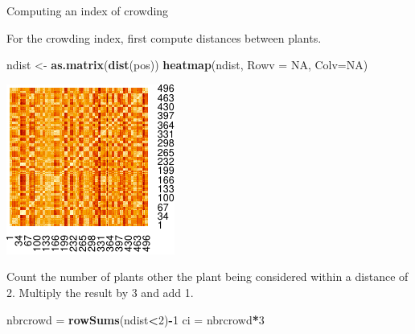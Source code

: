 \documentclass[
  ignorenonframetext,
]{beamer}
\newenvironment{Shaded}{\begin{snugshade}}{\end{snugshade}}
\newcommand{\DataTypeTok}[1]{\textcolor[rgb]{0.13,0.29,0.53}{#1}}
\newcommand{\DecValTok}[1]{\textcolor[rgb]{0.00,0.00,0.81}{#1}}
\newcommand{\KeywordTok}[1]{\textcolor[rgb]{0.13,0.29,0.53}{\textbf{#1}}}
\newcommand{\NormalTok}[1]{#1}
\newcommand{\OperatorTok}[1]{\textcolor[rgb]{0.81,0.36,0.00}{\textbf{#1}}}
\newcommand{\OtherTok}[1]{\textcolor[rgb]{0.56,0.35,0.01}{#1}}
\newcommand{\StringTok}[1]{\textcolor[rgb]{0.31,0.60,0.02}{#1}}
\begin{document}
\begin{frame}[fragile]{Computing an index of crowding}
\protect\hypertarget{computing-an-index-of-crowding}{}

For the crowding index, first compute distances between plants.
\scriptsize

\begin{Shaded}
\begin{Highlighting}[]
\NormalTok{ndist <-}\StringTok{ }\KeywordTok{as.matrix}\NormalTok{(}\KeywordTok{dist}\NormalTok{(pos))}
\KeywordTok{heatmap}\NormalTok{(ndist, }\DataTypeTok{Rowv =} \OtherTok{NA}\NormalTok{, }\DataTypeTok{Colv=}\OtherTok{NA}\NormalTok{)}
\end{Highlighting}
\end{Shaded}

\includegraphics{simulation_files/figure-beamer/unnamed-chunk-16-1.pdf}
\normalsize

Count the number of plants other the plant being considered within a
distance of 2. Multiply the result by 3 and add 1.

\scriptsize

\begin{Shaded}
\begin{Highlighting}[]
\NormalTok{nbrcrowd =}\StringTok{ }\KeywordTok{rowSums}\NormalTok{(ndist}\OperatorTok{<}\DecValTok{2}\NormalTok{)}\OperatorTok{-}\DecValTok{1}
\NormalTok{ci =}\StringTok{ }\NormalTok{nbrcrowd}\OperatorTok{*}\DecValTok{3}
\end{Highlighting}
\end{Shaded}

\end{frame}
\end{document}
